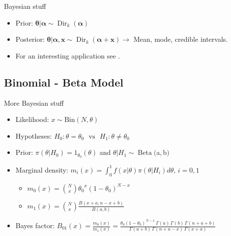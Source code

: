 
\begin{frame}{Bayesian stuff}
	\begin{itemize}
	\item Prior: $\bm{\theta}|\bm{\alpha} \sim \operatorname{Dir}_k(\bm{\alpha})$
	\item Posterior: $\bm{\theta} | \bm{\alpha}, \bm{x} \sim \operatorname{Dir}_k(\bm{\alpha} + \bm{x}) \rightarrow$ Mean, mode, credible intervals.
	\item For an interesting application see \citet{ley1996peculiar}.
	\end{itemize}
\end{frame}

\subsection{Binomial - Beta Model}


\begin{frame}{More Bayesian stuff}
\begin{itemize}
	\item Likelihood: $x \sim \text{Bin}(N, \theta)$
	\item  Hypotheses: $ H_0: {\theta}={\theta_0} \,\,\,\, \text{vs} \,\,\,\,  H_1: {\theta} \neq \theta_0$
	\item Prior: $\pi(\theta|H_0)={1_{\theta_0}(\theta)}$ and $\theta| H_1 \sim \operatorname{Beta}($a$,$b$) $
	\item Marginal density: $m_i(x)= \int_0^1 f(x|\theta)\pi(\theta|H_i)d \theta, \,  i=0, 1$
		\begin{itemize}
		\item $m_0(x)=\binom{N}{x} {\theta_0}^{x}{(1-\theta_0)}^{N-x}$ 
		\item  $m_1(x) = \binom{N}{x}\frac{B(x+a, n-x+b)}{B(a,b)}$
		\end{itemize}
	\item Bayes factor: $B_{01}(x) = \frac{m_0(x)}{m_1(x)}  = \frac{\theta_0(1-\theta_0)^{N-x}\,\Gamma(a)\,\Gamma(b)\,\Gamma(n+a+b)}{\Gamma(a+b)\,\Gamma(n+a-x)\,\Gamma(x+a)}$ 
	\end{itemize}
\end{frame}


